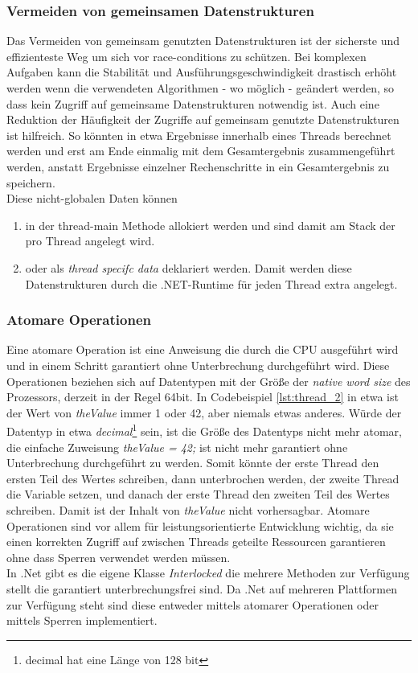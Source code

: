 \subsubsection{Vermeiden von gemeinsamen Datenstrukturen}	
Das Vermeiden von gemeinsam genutzten Datenstrukturen ist der sicherste und effizienteste Weg um sich vor race-conditions zu schützen. Bei komplexen Aufgaben kann die Stabilität und Ausführungsgeschwindigkeit drastisch erhöht werden wenn die verwendeten Algorithmen - wo möglich - geändert werden, so dass kein Zugriff auf gemeinsame Datenstrukturen notwendig ist. Auch eine Reduktion der Häufigkeit der Zugriffe auf gemeinsam genutzte Datenstrukturen ist hilfreich. So könnten in etwa Ergebnisse innerhalb eines Threads berechnet werden und erst am Ende einmalig mit dem Gesamtergebnis zusammengeführt werden, anstatt Ergebnisse einzelner Rechenschritte in ein Gesamtergebnis zu speichern.
\\Diese nicht-globalen Daten können
\begin{enumerate}
	\item in der thread-main Methode allokiert werden und sind damit am Stack der pro Thread angelegt wird.
	\item oder als \textit{thread specifc data} deklariert werden. Damit werden diese Datenstrukturen durch die .NET-Runtime für jeden Thread extra angelegt.
\end{enumerate}

\subsubsection{Atomare Operationen}	
Eine atomare Operation ist eine Anweisung die durch die CPU ausgeführt wird und in einem Schritt garantiert ohne Unterbrechung durchgeführt wird. Diese Operationen beziehen sich auf Datentypen mit der Größe der \textit{native word size} des Prozessors\parencite[S. 102]{ecma335}, derzeit in der Regel 64bit. In Codebeispiel \ref{lst:thread_2}  in etwa ist der Wert von \textit{theValue} immer 1 oder 42, aber niemals etwas anderes. Würde der Datentyp in etwa \textit{decimal}\footnote{decimal hat eine Länge von 128 bit} sein, ist die Größe des Datentyps nicht mehr atomar, die einfache Zuweisung \textit{theValue = 42;} ist nicht mehr garantiert ohne Unterbrechung durchgeführt zu werden. Somit könnte der erste Thread den ersten Teil des Wertes schreiben, dann unterbrochen werden, der zweite Thread die Variable setzen, und danach der erste Thread den zweiten Teil des Wertes schreiben. Damit ist der Inhalt von \textit{theValue} nicht vorhersagbar. Atomare Operationen sind vor allem für leistungsorientierte Entwicklung wichtig, da sie einen korrekten Zugriff auf zwischen Threads geteilte Ressourcen garantieren ohne dass Sperren verwendet werden müssen.
\\In .Net gibt es die eigene Klasse \textit{Interlocked} die mehrere Methoden zur Verfügung stellt die garantiert unterbrechungsfrei sind. Da .Net auf mehreren Plattformen zur Verfügung steht sind diese entweder mittels atomarer Operationen oder mittels Sperren implementiert.

